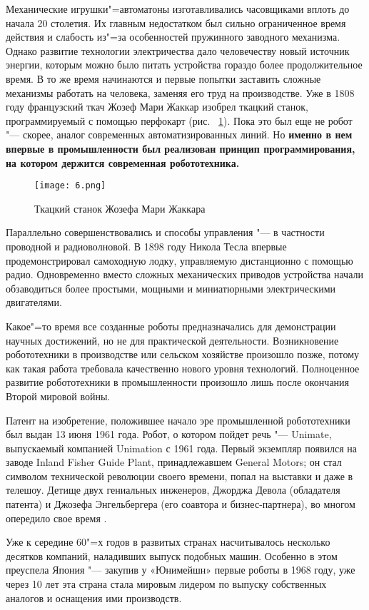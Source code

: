 \documentclass[bachelor, och, referat]{SCWorks}
\begin{document}
Механические игрушки"=автоматоны изготавливались часовщиками вплоть до начала 20
столетия. Их главным недостатком был сильно ограниченное время действия и
слабость из"=за особенностей пружинного заводного механизма. Однако развитие
технологии электричества дало человечеству новый источник энергии, которым можно
было питать устройства гораздо более продолжительное время. В то же время
начинаются и первые попытки заставить сложные механизмы работать на человека,
заменяя его труд на производстве. Уже в 1808 году французский ткач Жозеф Мари
Жаккар изобрел ткацкий станок, программируемый с помощью перфокарт (рис.
~\ref{fig:6}). Пока это был еще не робот "--- скорее, аналог современных
автоматизированных линий. Но \textbf{именно в нем впервые в промышленности был
реализован принцип программирования, на котором держится современная
робототехника.}

\begin{figure}[h!]
    \centering
    \texttt{[image: 6.png]}
    \caption{\label{fig:6}%
    Ткацкий станок Жозефа Мари Жаккара}
\end{figure}

Параллельно совершенствовались и способы управления "--- в частности проводной и радиоволновой. В 1898 году Никола Тесла впервые продемонстрировал самоходную лодку, управляемую дистанционно с помощью радио. Одновременно вместо сложных механических приводов устройства начали обзаводиться более простыми, мощными и миниатюрными электрическими двигателями.

Какое"=то время все созданные роботы предназначались для демонстрации научных
достижений, но не для практической деятельности. Возникновение робототехники в
производстве или сельском хозяйстве произошло позже, потому как такая работа
требовала качественно нового уровня технологий. Полноценное развитие
робототехники в промышленности произошло лишь после окончания Второй мировой
войны.

Патент на изобретение, положившее начало эре промышленной робототехники был
выдан 13 июня 1961 года. Робот, о котором пойдет речь "--- Unimate, выпускаемый
компанией Unimation с 1961 года. Первый экземпляр появился на заводе Inland
Fisher Guide Plant, принадлежавшем General Motors; он стал символом технической
революции своего времени, попал на выставки и даже в телешоу. Детище двух
гениальных инженеров, Джорджа Девола (обладателя патента) и Джозефа
Энгельбергера (его соавтора и бизнес-партнера), во многом опередило свое время \cite{3}.

 Уже к середине 60"=х годов в развитых странах насчитывалось несколько десятков
 компаний, наладивших выпуск подобных машин. Особенно в этом преуспела Япония
 "--- закупив у «Юнимейшн» первые роботы в 1968 году, уже через 10 лет эта
 страна стала мировым лидером по выпуску собственных аналогов и оснащения ими
 производств.
\end{document}

